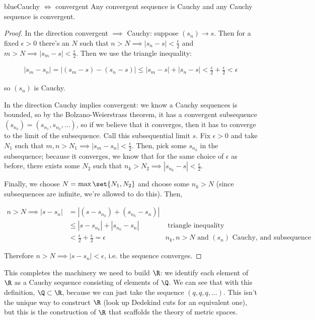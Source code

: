 \documentclass[./analysis.tex]{subfiles}
\begin{document}
    \begin{mycolorbox}{blue}{Cauchy $\iff$ convergent} Any convergent sequence is Cauchy and any Cauchy sequence is convergent.\end{mycolorbox}

    \begin{proof}
        In the direction convergent $\implies$ Cauchy: suppose $(s_n) \to s$. Then for a fixed $\epsilon > 0$ there's an $N$ such that $n > N \implies |s_n - s| < \frac{\epsilon}{2}$ and $m > N \implies |s_m - s| < \frac{\epsilon}{2}$. Then we use the triangle inequality:

        \begin{align*}
            |s_m - s_n| = |(s_m - s) - (s_n - s)| \leq |s_m - s| + |s_n - s| < \frac{\epsilon}{2} + \frac{\epsilon}{2} < \epsilon
        \end{align*}

        so $(s_n)$ is Cauchy. 

        In the direction Cauchy implies convergent: we know a Cauchy sequences is bounded, so by the Bolzano-Weierstrass theorem, it has a convergent subsequence $(s_{n_k}) = (s_{n_1}, s_{n_2}, \dots)$, so if we believe that it converges, then it has to converge to the limit of the subsequence. Call this subsequential limit $s$. Fix $\epsilon > 0$ and take $N_1$ such that $m, n > N_1 \implies |s_m - s_n| < \frac{\epsilon}{2}$. Then, pick some $s_{n_k}$ in the subsequence; because it converges, we know that for the same choice of $\epsilon$ as before, there exists some $N_2$ such that $n_k > N_2 \implies |s_{n_k} - s| < \frac{\epsilon}{2}$. 

        Finally, we choose $N = \max\set{N_1, N_2}$ and choose some $n_k > N$ (since subsequences are infinite, we're allowed to do this). Then,

        \begin{align*}
            n > N \implies |s - s_n| &= |(s - s_{n_k}) + (s_{n_k} - s_n)| & \\&\leq |s - s_{n_k}| + |s_{n_k} - s_n| & \text{ triangle inequality}\\
            &< \frac{\epsilon}{2} + \frac{\epsilon}{2} = \epsilon & n_k, n > N \text{ and } (s_n) \text{ Cauchy, and subsequence converges}
        \end{align*}

        Therefore $n > N \implies |s - s_n| < \epsilon$, i.e. the sequence converges.
    \end{proof}

    This completes the machinery we need to build $\R$: we identify each element of $\R$ as a Cauchy sequence consisting of elements of $\Q$. We can see that with this definition, $\Q \subset \R$, because we can just take the sequence $(q, q, q, \dots)$. This isn't the unique way to construct $\R$ (look up Dedekind cuts for an equivalent one), but this is the construction of $\R$ that scaffolds the theory of metric spaces.
\end{document}
